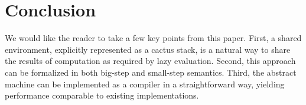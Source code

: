 \section{Conclusion} \label{sec:conc}

We would like the reader to take a few key points from this paper. First, a
shared environment, explicitly represented as a cactus stack, is a natural
way to share the results of computation as required by lazy evaluation. Second,
this approach can be formalized in both big-step and small-step semantics.
Third, the abstract machine can be implemented as a compiler in a
straightforward way, yielding performance comparable to existing
implementations. 
